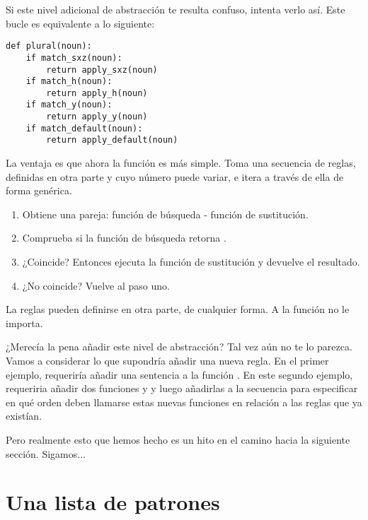 Si este nivel adicional de abstracción te resulta confuso, intenta verlo así. Este bucle  es equivalente a lo siguiente:

\noindent\begin{minipage}{\textwidth}
\begin{lstlisting}[mathescape=True]
def plural(noun):
    if match_sxz(noun):
        return apply_sxz(noun)
    if match_h(noun):
        return apply_h(noun)
    if match_y(noun):
        return apply_y(noun)
    if match_default(noun):
        return apply_default(noun)
\end{lstlisting}
\end{minipage}

La ventaja es que ahora la función  es más simple. Toma una secuencia de reglas, definidas en otra parte y cuyo número puede variar, e itera a través de ella de forma genérica.

\begin{enumerate}

\item Obtiene una pareja: función de búsqueda - función de sustitución.

\item Comprueba si la función de búsqueda retorna .

\item ¿Coincide? Entonces ejecuta la función de sustitución y devuelve el resultado.

\item ¿No coincide? Vuelve al paso uno.

\end{enumerate}

La reglas pueden definirse en otra parte, de cualquier forma. A la función  no le importa.

¿Merecía la pena añadir este nivel de abstracción? Tal vez aún no te lo parezca. Vamos a considerar lo que supondría añadir una nueva regla. En el primer ejemplo, requeriría añadir una sentencia  a la función . En este segundo ejemplo, requeriria añadir dos funciones  y  y luego añadirlas a la secuencia  para especificar en qué orden deben llamarse estas nuevas funciones en relación a las reglas que ya existían.

Pero realmente esto que hemos hecho es un hito en el camino hacia la siguiente sección. Sigamos...

\section{Una lista de patrones}

